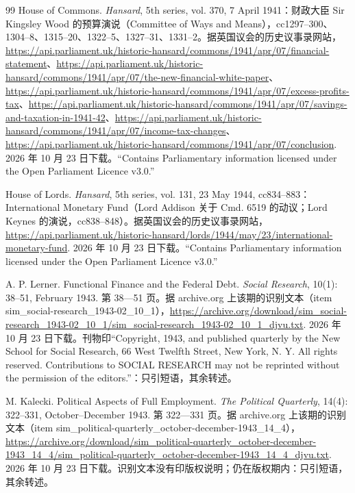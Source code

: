 \begin{thebibliography}{99}
 House of Commons. \emph{Hansard}, 5th series, vol. 370, 7 April 1941：财政大臣 Sir Kingsley Wood 的预算演说（Committee of Ways and Means），cc1297--300、1304--8、1315--20、1322--5、1327--31、1331--2。据英国议会的历史议事录网站，\url{https://api.parliament.uk/historic-hansard/commons/1941/apr/07/financial-statement}、\url{https://api.parliament.uk/historic-hansard/commons/1941/apr/07/the-new-financial-white-paper}、\url{https://api.parliament.uk/historic-hansard/commons/1941/apr/07/excess-profits-tax}、\url{https://api.parliament.uk/historic-hansard/commons/1941/apr/07/savings-and-taxation-in-1941-42}、\url{https://api.parliament.uk/historic-hansard/commons/1941/apr/07/income-tax-changes}、\url{https://api.parliament.uk/historic-hansard/commons/1941/apr/07/conclusion}. 2026 年 10 月 23 日下载。“Contains Parliamentary information licensed under the Open Parliament Licence v3.0.”

 House of Lords. \emph{Hansard}, 5th series, vol. 131, 23 May 1944, cc834--883：International Monetary Fund（Lord Addison 关于 Cmd. 6519 的动议；Lord Keynes 的演说，cc838--848）。据英国议会的历史议事录网站，\url{https://api.parliament.uk/historic-hansard/lords/1944/may/23/international-monetary-fund}. 2026 年 10 月 23 日下载。“Contains Parliamentary information licensed under the Open Parliament Licence v3.0.”

 A. P. Lerner. Functional Finance and the Federal Debt. \emph{Social Research}, 10(1): 38--51, February 1943. 第 38—51 页。据 archive.org 上该期的识别文本（item sim\_social-research\_1943-02\_10\_1），\url{https://archive.org/download/sim_social-research_1943-02_10_1/sim_social-research_1943-02_10_1_djvu.txt}. 2026 年 10 月 23 日下载。刊物印“Copyright, 1943, and published quarterly by the New School for Social Research, 66 West Twelfth Street, New York, N. Y. All rights reserved. Contributions to SOCIAL RESEARCH may not be reprinted without the permission of the editors.”：只引短语，其余转述。

 M. Kalecki. Political Aspects of Full Employment. \emph{The Political Quarterly}, 14(4): 322--331, October--December 1943. 第 322—331 页。据 archive.org 上该期的识别文本（item sim\_political-quarterly\_october-december-1943\_14\_4），\url{https://archive.org/download/sim_political-quarterly_october-december-1943_14_4/sim_political-quarterly_october-december-1943_14_4_djvu.txt}. 2026 年 10 月 23 日下载。识别文本没有印版权说明；仍在版权期内：只引短语，其余转述。


\end{thebibliography}
